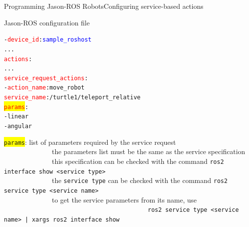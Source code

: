 \documentclass[compress]{beamer}
\newcommand{\yamlkey}[1]{\textcolor{red}{\texttt{#1}}}
\newcommand{\yamlvalue}[1]{\textcolor{blue}{\texttt{#1}}}
\begin{document}
\begin{frame}[fragile]{Programming Jason-ROS Robots}{Configuring service-based actions}{}


\footnotesize

 
\begin{block}{Jason-ROS configuration file}


\scriptsize
\begin{alltt}\scriptsize
- \yamlkey{device_id}: \yamlvalue{sample_roshost}
     ...
  \yamlkey{actions}:        
        ...
     \yamlkey{service_request_actions}:
        - \yamlkey{action_name}: move_robot
          \yamlkey{service_name}: /turtle1/teleport_relative
          \colorbox{yellow}{\yamlkey{params}}:
             - linear
             - angular
\end{alltt}

    
\end{block}  

 \colorbox{yellow}{\texttt{params}}: list of parameters required by the service request\\
 
 \vspace{-.5cm}
 \ \ \ \ \ \ \ \ \ \ \ \ \ \ {\tiny the parameters list must be the same as the service specification}\\ 
 
 \vspace{-.5cm}
 \ \ \ \ \ \ \ \ \ \ \ \ \ \  {\tiny this specification can be checked with the command \texttt{ros2 interface show <service type>}}\\
 
 \vspace{-.5cm}
 \ \ \ \ \ \ \ \ \ \ \ \ \ \  {\tiny the \texttt{service type} can be checked with the command \texttt{ros2 service type <service name>}} \\
 
  \vspace{-.5cm}
 \ \ \ \ \ \ \ \ \ \ \ \ \ \  {\tiny to get the service parameters from its name, use}\\
 
 \vspace{-.5cm}
 \ \ \ \ \ \ \ \ \ \ \ \ \ \ \ \ \ \ \ \ \ \ \ \ \ \ \ \ \ \ \ \ \ \ \ \ \ \ \ \ \ \  {\tiny\texttt{ros2 service type <service name> | xargs ros2 interface show}}
 

\scriptsize

\end{frame}
\end{document}
